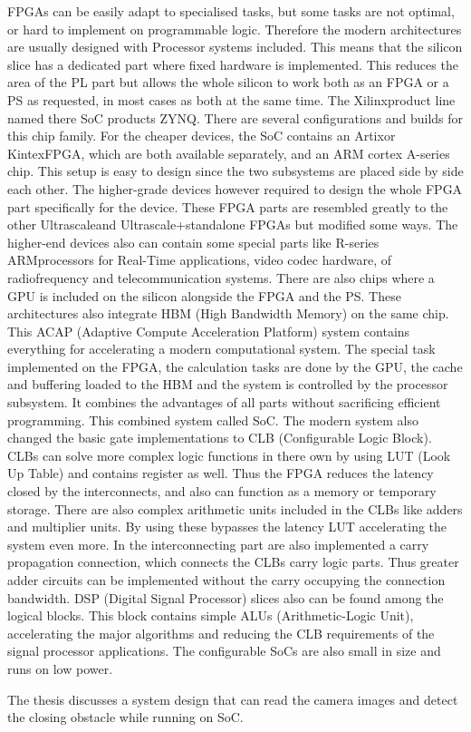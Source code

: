 FPGAs can be easily adapt to specialised tasks, but some tasks are not optimal, or hard to implement on programmable logic.
Therefore the modern architectures are usually designed with Processor systems included.
This means that the silicon slice has a dedicated part where fixed hardware is implemented.
This reduces the area of the PL part but allows the whole silicon to work both as an FPGA or a PS as requested, in most cases as both at the same time.
The Xilinx\texttrademark product line named there SoC products ZYNQ.
There are several configurations and builds for this chip family.
For the cheaper devices, the SoC contains an Artix\texttrademark or Kintex\texttrademark FPGA, which are both available separately, and an ARM cortex A-series chip.
This setup is easy to design since the two subsystems are placed side by side each other.
The higher-grade devices however required to design the whole FPGA part specifically for the device.
These FPGA parts are resembled greatly to the other Ultrascale\texttrademark and Ultrascale+\texttrademark standalone FPGAs but modified some ways.
The higher-end devices also can contain some special parts like R-series ARM\texttrademark processors for Real-Time applications, video codec hardware, of radiofrequency and telecommunication systems.
There are also chips where a GPU is included on the silicon alongside the FPGA and the PS.
These architectures also integrate HBM (High Bandwidth Memory) on the same chip.
This ACAP (Adaptive Compute Acceleration Platform) system contains everything for accelerating a modern computational system.
The special task implemented on the FPGA, the calculation tasks are done by the GPU, the cache and buffering loaded to the HBM and the system is controlled by the processor subsystem.
It combines the advantages of all parts without sacrificing efficient programming. 
This combined system called SoC.
The modern system also changed the basic gate implementations to CLB (Configurable Logic Block).
CLBs can solve more complex logic functions in there own by using LUT (Look Up Table) and contains register as well.
Thus the FPGA reduces the latency closed by the interconnects, and also can function as a memory or temporary storage.
There are also complex arithmetic units included in the CLBs like adders and multiplier units.
By using these bypasses the latency LUT accelerating the system even more.
In the interconnecting part are also implemented a carry propagation connection, which connects the CLBs carry logic parts.
Thus greater adder circuits can be implemented without the carry occupying the connection bandwidth.
DSP (Digital Signal Processor) slices also can be found among the logical blocks.
This block contains simple ALUs (Arithmetic-Logic Unit), accelerating the major algorithms and reducing the CLB requirements of the signal processor applications.
The configurable SoCs are also small in size and runs on low power.

The thesis discusses a system design that can read the camera images and detect the closing obstacle while running on SoC.

\clearpage %